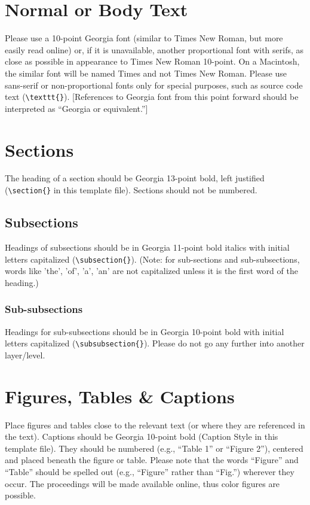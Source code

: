 \documentclass{icis}
\begin{document}
\section{Normal or Body Text}
Please use a 10-point Georgia font (similar to Times New Roman, but more easily
read online) or, if it is unavailable, another proportional font with serifs, as
close as possible in appearance to Times New Roman 10-point. On a Macintosh, the
similar font will be named Times and not Times New Roman. Please use sans-serif
or non-proportional fonts only for special purposes, such as source code text
(\texttt{\textbackslash texttt\{\}}). [References to Georgia font from this
    point forward should be interpreted as ``Georgia or equivalent.'']

\section{Sections}
The heading of a section should be Georgia 13-point bold, left justified
(\texttt{\textbackslash section\{\}} in this template file).  Sections should not be numbered.

\subsection{Subsections}
Headings of subsections should be in Georgia 11-point bold italics with initial
letters capitalized (\texttt{\textbackslash subsection\{\}}). (Note: for
sub-sections and sub-subsections, words like 'the', 'of', 'a', 'an' are not
capitalized unless it is the first word of the heading.)

\subsubsection{Sub-subsections}
Headings for sub-subsections should be in Georgia 10-point bold with initial
letters capitalized (\texttt{\textbackslash subsubsection\{\}}). Please do not
go any further into another layer/level.

\section{Figures, Tables \& Captions}
Place figures and tables close to the relevant text (or where they are
referenced in the text).  Captions should be Georgia 10-point bold (Caption
Style in this template file).  They should be numbered (e.g., ``Table 1'' or
``Figure 2''), centered and placed beneath the figure or table.  Please note that
the words ``Figure'' and ``Table'' should be spelled out (e.g., ``Figure'' rather than ``Fig.'') wherever they occur. The proceedings will be made available online, thus color figures are possible.
\end{document}
